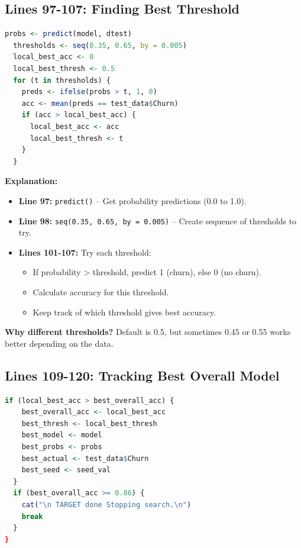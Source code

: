 \documentclass[12pt,a4paper]{article}
\begin{document}
\subsection{Lines 97-107: Finding Best Threshold}

\begin{lstlisting}[language=R]
  probs <- predict(model, dtest)
  thresholds <- seq(0.35, 0.65, by = 0.005)
  local_best_acc <- 0
  local_best_thresh <- 0.5
  for (t in thresholds) {
    preds <- ifelse(probs > t, 1, 0)
    acc <- mean(preds == test_data$Churn)
    if (acc > local_best_acc) {
      local_best_acc <- acc
      local_best_thresh <- t
    }
  }
\end{lstlisting}

\textbf{Explanation:}
\begin{itemize}
    \item \textbf{Line 97:} \texttt{predict()} -- Get probability predictions (0.0 to 1.0).
    \item \textbf{Line 98:} \texttt{seq(0.35, 0.65, by = 0.005)} -- Create sequence of thresholds to try.
    \item \textbf{Lines 101-107:} Try each threshold:
    \begin{itemize}
        \item If probability > threshold, predict 1 (churn), else 0 (no churn).
        \item Calculate accuracy for this threshold.
        \item Keep track of which threshold gives best accuracy.
    \end{itemize}
\end{itemize}

\textbf{Why different thresholds?} Default is 0.5, but sometimes 0.45 or 0.55 works better depending on the data.

\subsection{Lines 109-120: Tracking Best Overall Model}

\begin{lstlisting}[language=R]
  if (local_best_acc > best_overall_acc) {
    best_overall_acc <- local_best_acc
    best_thresh <- local_best_thresh
    best_model <- model
    best_probs <- probs
    best_actual <- test_data$Churn
    best_seed <- seed_val
  }
  if (best_overall_acc >= 0.86) {
    cat("\n TARGET done Stopping search.\n")
    break
  }
}
\end{lstlisting}
\end{document}
